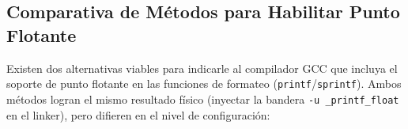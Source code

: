 \documentclass[
10pt, %
a4paper, %
oneside, %
headinclude,footinclude, %
BCOR5mm, %
]{scrartcl}
\begin{document}
\subsection{Comparativa de Métodos para Habilitar Punto Flotante}

Existen dos alternativas viables para indicarle al compilador GCC que incluya el soporte de punto flotante en las funciones de formateo (\texttt{printf}/\texttt{sprintf}). Ambos métodos logran el mismo resultado físico (inyectar la bandera \texttt{-u \_printf\_float} en el linker), pero difieren en el nivel de configuración:
\end{document}
